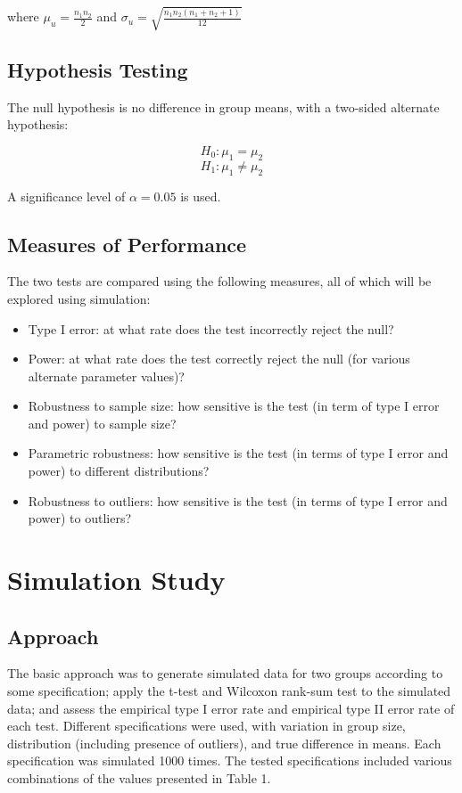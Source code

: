 \documentclass{report}
\begin{document}
where $\mu_u = \frac{n_1n_2}{2}$ and $\sigma_u =
\sqrt{\frac{n_1n_2(n_1+n_2+1)}{12}}$

\subsection*{Hypothesis Testing}

The null hypothesis is no difference in group means, with a two-sided alternate
hypothesis:

$$
H_0: \mu_1 = \mu_2
$$
$$
H_1: \mu_1 \neq \mu_2
$$

A significance level of $\alpha = 0.05$ is used.

\subsection*{Measures of Performance}

The two tests are compared using the following measures, all of which will be
explored using simulation:

\begin{itemize}
	\item Type I error: at what rate does the test incorrectly reject the null?
	\item Power: at what rate does the test correctly reject the null (for various
		alternate parameter values)?
	\item Robustness to sample size: how sensitive is the test (in term of type I
		error and power) to sample size?
	\item Parametric robustness: how sensitive is the test
		(in terms of type I error and power) to different distributions?
	\item Robustness to outliers: how sensitive is the test (in terms of
		type I error and power) to outliers?
\end{itemize}

\section*{Simulation Study}
\subsection*{Approach}
The basic approach was to generate simulated data for two
groups according to some specification; apply the t-test
and Wilcoxon rank-sum test to the simulated data; and assess the empirical type I error rate 
and empirical type II error rate of each
test. Different specifications were used, with variation in group
size, distribution (including presence of outliers), and true difference in
means. Each specification was simulated 1000 times. The tested specifications 
included various combinations of the values presented in Table 1.
\end{document}
